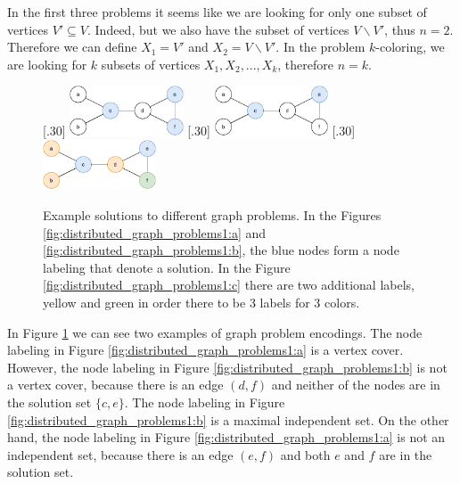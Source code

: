 In the first three problems it seems like we are looking for only one subset of vertices $V' \subseteq V$.
Indeed, but we also have the subset of vertices $V \backslash V'$, thus $n=2$.
Therefore we can define $X_1 = V'$ and $X_2 = V \backslash V'$.
In the problem $k$-coloring, we are looking for $k$ subsets of vertices $X_1, X_2, ..., X_k$, therefore $n=k$.

\begin{figure}[H]
    [.30\linewidth] {
    \centering
    \includegraphics[width=0.30\textwidth]{diagrams/formalizing_pn_network_6.pdf}
  }
  \hfill
    [.30\linewidth] {
    \centering
    \includegraphics[width=0.30\textwidth]{diagrams/formalizing_pn_network_7.pdf}
  }
  \hfill
    [.30\linewidth] {
    \centering
    \includegraphics[width=0.30\textwidth]{diagrams/formalizing_pn_network_8.pdf}
  }
  \caption{Example solutions to different graph problems.
  In the Figures \ref{fig:distributed_graph_problems1:a} and \ref{fig:distributed_graph_problems1:b}, the blue nodes form a node labeling that denote a solution.
  In the Figure \ref{fig:distributed_graph_problems1:c} there are two additional labels, yellow and green in order there to be 3 labels for 3 colors.
  }
  \label{fig:distributed_graph_problems1}
\end{figure}

In Figure \ref{fig:distributed_graph_problems1} we can see two examples of graph problem encodings.
The node labeling in Figure \ref{fig:distributed_graph_problems1:a} is a vertex cover.
However, the node labeling in Figure \ref{fig:distributed_graph_problems1:b} is not a vertex cover, because there is an edge $(d, f)$ and neither of the nodes are in the solution set $\{c, e\}$.
The node labeling in Figure \ref{fig:distributed_graph_problems1:b} is a maximal independent set.
On the other hand, the node labeling in Figure \ref{fig:distributed_graph_problems1:a} is not an independent set, because there is an edge $(e, f)$ and both $e$ and $f$ are in the solution set.



